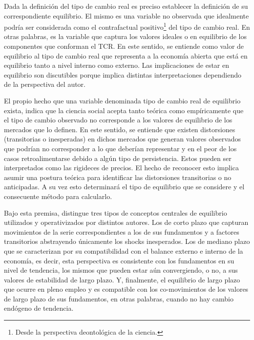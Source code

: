 \documentclass[12pt,letterpaper]{article}
\begin{document}
Dada la definición del tipo de cambio real es preciso establecer la definición de su correspondiente equilibrio. El mismo es una variable no observada que idealmente podría ser considerada como el contrafactual positivo\footnote{Desde la perspectiva deontológica de la ciencia.} del tipo de cambio real. En otras palabras, es la variable que captura los valores ideales o en equilibrio de los componentes que conforman el TCR. En este sentido, se entiende como valor de equilibrio al tipo de cambio real que representa a la economía abierta que está en equilibrio tanto a nivel interno como externo. Las implicaciones de estar en equilibrio son discutibles porque implica distintas interpretaciones dependiendo de la perspectiva del autor.

El propio hecho que una variable denominada tipo de cambio real de equilibrio exista, indica que la ciencia social acepta tanto teórica como empíricamente que el tipo de cambio observado no corresponde a los valores de equilibrio de los mercados que lo definen. En este sentido, se entiende que existen distorsiones (transitorias o inesperadas) en dichos mercados que generan valores observados que podrían no corresponder a lo que deberían representar y en el peor de los casos retroalimentarse debido a algún tipo de persistencia. Estos pueden ser interpretados como las rigideces de precios. El hecho de reconocer esto implica asumir una postura teórica para identificar las distorsiones transitorias o no anticipadas. A su vez esto determinará el tipo de equilibrio que se considere y el consecuente método para calcularlo.

Bajo esta premisa, \cite{driver2005concepts} distingue tres tipos de conceptos centrales de equilibrio utilizados y operativizados por distintos autores. Los de corto plazo que capturan movimientos de la serie correspondientes a los de sus fundamentos y a factores transitorios abstrayendo únicamente los shocks inesperados. Los de mediano plazo que se caracterizan por su compatibilidad con el balance externo e interno de la economía, es decir, esta perspectiva es consistente con los fundamentos en su nivel de tendencia, los mismos que pueden estar aún convergiendo, o no, a sus valores de estabilidad de largo plazo. Y, finalmente, el equilibrio de largo plazo que ocurre en pleno empleo y es compatible con los co-movimientos de los valores de largo plazo de sus fundamentos, en otras palabras, cuando no hay cambio endógeno de tendencia.
\end{document}
